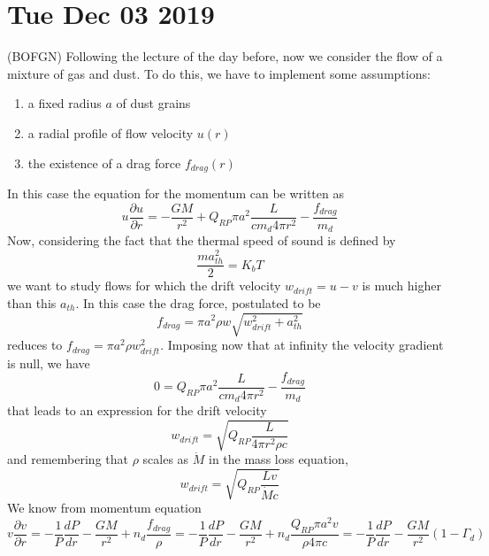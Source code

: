 \documentclass[main.tex]{subfiles}
\begin{document}
\section*{Tue Dec 03 2019}

(BOFGN)
Following the lecture of the day before, now we consider the flow of a mixture of gas and dust. To do this, we have to implement some assumptions:
\begin{enumerate}
    \item a fixed radius $a$ of dust grains
    \item a radial profile of flow velocity $u(r)$
    \item the existence of a drag force $f_{drag}(r)$
\end{enumerate}
In this case the equation for the momentum can be written as
\begin{equation}
    u \frac{\partial u}{\partial r}=-\frac{GM}{r^2}+Q_{RP}\pi a^2 \frac{L}{c m_d 4\pi r^2}-\frac{f_{drag}}{m_d}
\end{equation}
Now, considering the fact that the thermal speed of sound is defined by
\begin{equation}
    \frac{m a_{th}^2}{2}=K_b T
\end{equation}
we want to study flows for which the drift velocity $w_{drift}=u-v$ is much higher than this $a_{th}$. In this case the drag force, postulated to be
\begin{equation}
    f_{drag}=\pi a^2\rho w \sqrt{w_{drift}^2+a_{th}^2}
\end{equation}
reduces to $f_{drag}=\pi a^2\rho w_{drift}^2$.
Imposing now that at infinity the velocity gradient is null, we have
\begin{equation}
    0=Q_{RP}\pi a^2 \frac{L}{c m_d 4\pi r^2}-\frac{f_{drag}}{m_d}
\end{equation}
that leads to an expression for the drift velocity
\begin{equation}
    w_{drift}=\sqrt{Q_{RP}\frac{L}{4\pi r^2\rho c}}
\end{equation}
and remembering that $\rho$ scales as $\dot M$ in the mass loss equation,
\begin{equation}
    w_{drift}=\sqrt{Q_{RP}\frac{L v}{\dot M c}}
\end{equation}
We know from momentum equation
\begin{equation}
    v \frac{\partial v}{\partial r}=-\frac{1}{P}\frac{d P}{d r}-\frac{GM}{r^2}+n_d\frac{f_{drag}}{\rho}= -\frac{1}{P}\frac{d P}{d r}-\frac{GM}{r^2}+n_d\frac{Q_{RP}\pi a^2 v}{\rho 4\pi c}=-\frac{1}{P}\frac{d P}{d r}-\frac{GM}{r^2}(1-\Gamma_d)
\end{equation}
\end{document}
